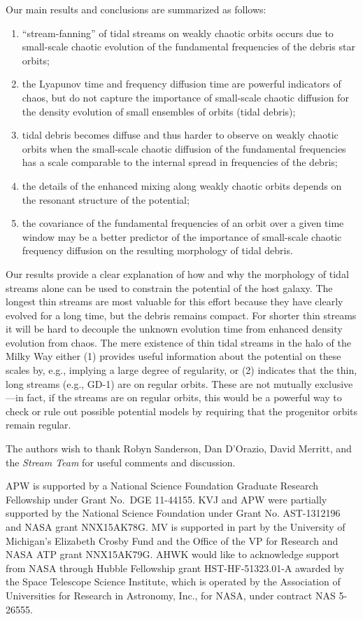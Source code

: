 \documentclass[letterpaper,12pt,preprint]{aastex}
\begin{document}
Our main results and conclusions are summarized as follows:
\begin{enumerate}
	\item ``stream-fanning'' of tidal streams on weakly chaotic orbits \citep[as seen in simulations by][]{pearson15} occurs due to small-scale chaotic evolution of the fundamental frequencies of the debris star orbits;
	\item the Lyapunov time and frequency diffusion time are powerful indicators of chaos, but do not capture the importance of small-scale chaotic diffusion for the density evolution of small ensembles of orbits (tidal debris);
	\item tidal debris becomes diffuse and thus harder to observe on weakly chaotic orbits when the small-scale chaotic diffusion of the fundamental frequencies has a scale comparable to the internal spread in frequencies of the debris;
	\item the details of the enhanced mixing along weakly chaotic orbits depends on the resonant structure of the potential;
	\item the covariance of the fundamental frequencies of an orbit over a given time window may be a better predictor of the importance of small-scale chaotic frequency diffusion on the resulting morphology of tidal debris.
\end{enumerate}

Our results provide a clear explanation of how and why the morphology of tidal streams alone can be used to constrain the potential of the host galaxy. The longest thin streams are most valuable for this effort because they have clearly evolved for a long time, but the debris remains compact. For shorter thin streams it will be hard to decouple the unknown evolution time from enhanced density evolution from chaos. The mere existence of thin tidal streams in the halo of the Milky Way either (1) provides useful information about the potential on these scales by, e.g., implying a large degree of regularity, or (2) indicates that the thin, long streams (e.g., GD-1) are on regular orbits. These are not mutually exclusive---in fact, if the streams are on regular orbits, this would be a powerful way to check or rule out possible potential models by requiring that the progenitor orbits remain regular. 

\acknowledgements
The authors wish to thank Robyn Sanderson, Dan D'Orazio, David Merritt, and the \emph{Stream Team} for useful comments and discussion. 

APW is supported by a National Science Foundation Graduate Research Fellowship under Grant No.\ DGE 11-44155. KVJ and APW were partially supported by the National Science Foundation under Grant No. AST-1312196 and NASA grant NNX15AK78G. MV is supported in part by the University of Michigan's Elizabeth Crosby Fund and the Office of the VP for Research and NASA ATP grant NNX15AK79G. AHWK would like to acknowledge support from NASA through Hubble Fellowship grant HST-HF-51323.01-A awarded by the Space Telescope Science Institute, which is operated by the Association of Universities for Research in Astronomy, Inc., for NASA, under contract NAS 5-26555. 
\end{document}
